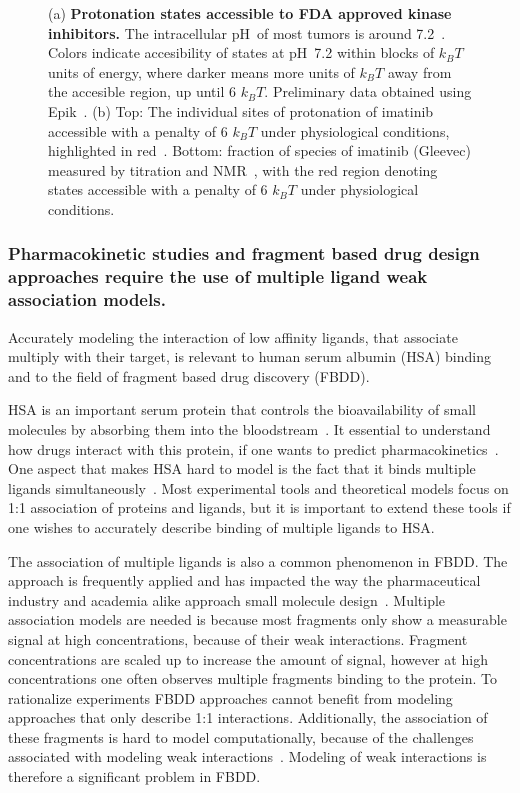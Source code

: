 \documentclass[10pt,final]{article}
\newcommand{\pH}{p$\mathrm{H}$\ }
\begin{document}
\begin{figure}[H]
\begin{subfigure}{.48\textwidth}
  \caption{}
  \label{figure:imatinib-pKa}
\end{subfigure}
\caption{(a) \textbf{Protonation states accessible to FDA approved kinase inhibitors.} 
The intracellular \pH of most tumors is around 7.2~\autocite{Griffiths1991a,Stubbs2000a}.
Colors indicate accesibility of states at \pH 7.2 within blocks of $k_BT$ units of energy, where darker means more units of $k_BT$ away from the accesible region, up until 6 $k_BT$.
Preliminary data obtained using Epik~\autocite{Shelley2007a,Greenwood2010a}.
(b) Top: The individual sites of protonation of imatinib accessible with a penalty of 6 $k_BT$ under physiological conditions, highlighted in red~\autocite{Szakacs2005a}. Bottom: fraction of species of imatinib (Gleevec) measured by titration and NMR~\autocite{Szakacs2005a}, with the red region denoting states accessible with a penalty of 6 $k_BT$ under physiological conditions.}
\label{figure:kinase-pKa}
\end{figure}


\subsubsection*{Pharmacokinetic studies and fragment based drug design approaches require the use of multiple ligand weak association models.}
Accurately modeling the interaction of low affinity ligands, that associate multiply with their target, is relevant to human serum albumin (HSA) binding and to the field of fragment based drug discovery (FBDD).

HSA is an important serum protein that controls the bioavailability of small molecules by absorbing them into the  bloodstream~\autocite{Smith1985a,Jr.1995a}.
%
It essential to understand how drugs interact with this protein, if one wants to predict pharmacokinetics~\autocite{Smith1985a,Bannwarth1996a,Kragh-Hansen2002a,Sulkowska2002a,Zsila2011a}.
%
One aspect that makes HSA hard to model is the fact that it binds multiple ligands simultaneously~\cite{He1992a,Jr.1995a,Curry1998a,Ghuman2005a,Pal2013a}.
%
Most experimental tools and theoretical models focus on 1:1 association of proteins and ligands, but it is important to extend these tools if one wishes to accurately describe binding of multiple ligands to HSA.

The association of multiple ligands is also a common phenomenon in FBDD.
%
The approach is frequently applied and has impacted the way the pharmaceutical industry and academia alike approach small molecule design~\autocite{Hajduk2007a}.
%
Multiple association models are needed is because most fragments only show a measurable signal at high concentrations, because of their weak interactions.
%
Fragment concentrations are scaled up to increase the amount of signal, however at high concentrations one often observes multiple fragments binding to the protein.
%
To rationalize experiments FBDD approaches cannot benefit from modeling approaches that only describe 1:1 interactions.
%
Additionally, the association of these fragments is hard to model computationally, because of the challenges associated with modeling weak interactions~\autocite{Gilson1997a}. 
%
Modeling of weak interactions is therefore a significant problem in FBDD.
\end{document}
